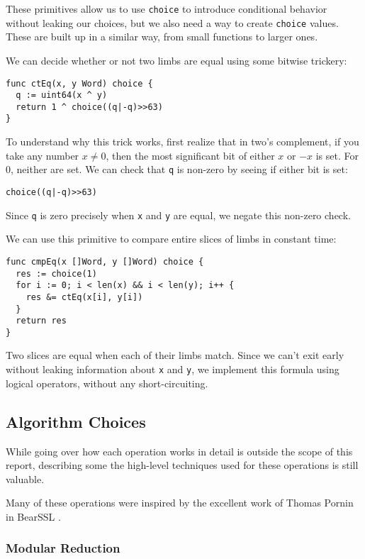 \documentclass[11pt, a4paper]{article} %
\begin{document}
{These primitives allow us to use \texttt{choice} to introduce conditional
behavior without leaking our choices, but we also need
a way to
create \texttt{choice} values. These are built up
in a similar way, from small functions to larger ones.

We can decide whether or not two limbs are equal using some bitwise
trickery:

\begin{verbatim}
func ctEq(x, y Word) choice {
  q := uint64(x ^ y)
  return 1 ^ choice((q|-q)>>63)
}
\end{verbatim}

To understand why this trick works, first realize that in two's complement,
if you take any number $x \neq 0$,
then the most significant bit of either $x$ or $-x$ is set.
For $0$, neither are set.
We can check that \texttt{q} is non-zero by seeing
if either bit is set:
\begin{verbatim}
choice((q|-q)>>63)
\end{verbatim}
Since \texttt{q} is zero precisely when \texttt{x} and \texttt{y}
are equal, we negate this non-zero check.

We can use this primitive to compare entire slices of limbs
in constant time:

\begin{verbatim}
func cmpEq(x []Word, y []Word) choice {
  res := choice(1)
  for i := 0; i < len(x) && i < len(y); i++ {
    res &= ctEq(x[i], y[i])
  }
  return res
}
\end{verbatim}

Two slices are equal when each of their limbs match.
Since we can't exit early without leaking information
about \texttt{x} and \texttt{y}, we implement this formula
using logical operators, without any short-circuiting.

\subsection{Algorithm Choices}

While going over how each operation works in detail is outside
the scope of this report, describing some the high-level
techniques used for these operations is still valuable.

Many of these operations were inspired by the excellent
work of Thomas Pornin in BearSSL
\cite{pornin_bearssl_2020-1}.

\subsubsection{Modular Reduction}

}
\end{document}

